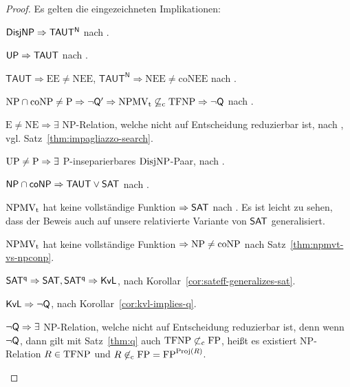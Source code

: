 \begin{proof}
    Es gelten die eingezeichneten Implikationen:
    \vspace{0pt plus 6pt}
    \begin{Prooflist}[nosep,midpenalty=0, label={\arabic*.},labelsep=3pt]
\item $\mathsf{DisjNP} \Rightarrow \mathsf{TAUT^N}$ nach \textcite[Cor.~6.1]{kobler_optimal_2003}.
\item $\mathsf{UP} \Rightarrow \mathsf{TAUT}$ nach \textcite[Cor.~4.1]{kobler_optimal_2003}. %
\item $\mathsf{TAUT}\Rightarrow \mathrm{EE\neq NEE}$, $\mathsf{TAUT^N}\Rightarrow \mathrm{NEE\neq coNEE}$ nach \textcite[Cor.~7.1]{kobler_optimal_2003}.
\item $\mathrm{NP}\cap\mathrm{coNP}\neq \mathrm{P} \Rightarrow \neg\mathsf{Q}' \Rightarrow \mathrm{NPMV_t} \not\subseteq_\mathrm{c} \mathrm{TFNP} \Rightarrow \neg\mathsf{Q}$ nach \textcite[Prop.~9, Thm. 6]{fenner_inverting_2003}.
\item $\mathrm{E\neq NE}\Rightarrow \exists$ NP-Relation, welche nicht auf Entscheidung reduzierbar ist, nach \textcite{impagliazzo_1991}, vgl. Satz~\ref{thm:impagliazzo-search}.
\item $\mathrm{UP}\neq\mathrm{P} \Rightarrow \exists$ P-inseparierbares $\mathrm{DisjNP}$-Paar, nach \textcite[Thm.~5]{grollmann_complexity_1988}.
\item $\mathsf{NP}{}\cap{}\mathsf{coNP}\Rightarrow \mathsf{TAUT}\lor\mathsf{SAT}$ nach \textcite[Cor.~5.1]{kobler_optimal_2003}. %
\item $\mathrm{NPMV_t}$ hat keine vollständige Funktion $\Rightarrow \mathsf{SAT}$ nach \textcite[Thm.~25]{beyersdorff_nondeterministic_2009}. Es ist leicht zu sehen, dass der Beweis auch auf unsere relativierte Variante von $\mathsf{SAT}$ generalisiert.
\item $\mathrm{NPMV_t}$ hat keine vollständige Funktion $\Rightarrow \mathrm{NP}\neq\mathrm{coNP}$ nach Satz~\ref{thm:npmvt-vs-npconp}.
\item $\mathsf{SAT^{q}} \Rightarrow \mathsf{SAT}, \mathsf{SAT^{q}}\Rightarrow \mathsf{KvL}$, nach Korollar~\ref{cor:sateff-generalizes-sat}.
\item $\mathsf{KvL}\Rightarrow\neg\mathsf{Q}$, nach Korollar~\ref{cor:kvl-implies-q}.
\item $\neg\mathsf{Q}\Rightarrow \exists$ NP-Relation, welche nicht auf Entscheidung reduzierbar ist, denn wenn $\neg\mathsf{Q}$, dann gilt mit Satz~\ref{thm:q} auch $\mathrm{TFNP}\not\subset_\mathrm{c} \mathrm{FP}$, heißt es existiert NP-Relation $R\in\mathrm{TFNP}$ und $R\not\in_\mathrm{c} \mathrm{FP} = \mathrm{FP}^{\operatorname{Proj}(R)}$.

\end{Prooflist}
\end{proof}
